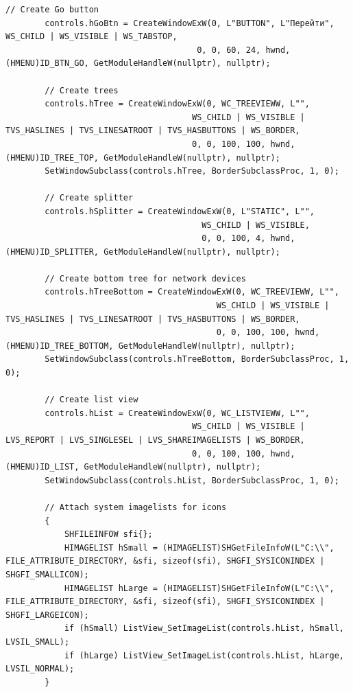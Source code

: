 \begin{lstlisting}[style=CodeListing]
        // Create Go button
        controls.hGoBtn = CreateWindowExW(0, L"BUTTON", L"Перейти", WS_CHILD | WS_VISIBLE | WS_TABSTOP,
                                       0, 0, 60, 24, hwnd, (HMENU)ID_BTN_GO, GetModuleHandleW(nullptr), nullptr);
        
        // Create trees
        controls.hTree = CreateWindowExW(0, WC_TREEVIEWW, L"",
                                      WS_CHILD | WS_VISIBLE | TVS_HASLINES | TVS_LINESATROOT | TVS_HASBUTTONS | WS_BORDER,
                                      0, 0, 100, 100, hwnd, (HMENU)ID_TREE_TOP, GetModuleHandleW(nullptr), nullptr);
        SetWindowSubclass(controls.hTree, BorderSubclassProc, 1, 0);
        
        // Create splitter
        controls.hSplitter = CreateWindowExW(0, L"STATIC", L"",
                                        WS_CHILD | WS_VISIBLE,
                                        0, 0, 100, 4, hwnd, (HMENU)ID_SPLITTER, GetModuleHandleW(nullptr), nullptr);
        
        // Create bottom tree for network devices
        controls.hTreeBottom = CreateWindowExW(0, WC_TREEVIEWW, L"",
                                           WS_CHILD | WS_VISIBLE | TVS_HASLINES | TVS_LINESATROOT | TVS_HASBUTTONS | WS_BORDER,
                                           0, 0, 100, 100, hwnd, (HMENU)ID_TREE_BOTTOM, GetModuleHandleW(nullptr), nullptr);
        SetWindowSubclass(controls.hTreeBottom, BorderSubclassProc, 1, 0);
        
        // Create list view
        controls.hList = CreateWindowExW(0, WC_LISTVIEWW, L"",
                                      WS_CHILD | WS_VISIBLE | LVS_REPORT | LVS_SINGLESEL | LVS_SHAREIMAGELISTS | WS_BORDER,
                                      0, 0, 100, 100, hwnd, (HMENU)ID_LIST, GetModuleHandleW(nullptr), nullptr);
        SetWindowSubclass(controls.hList, BorderSubclassProc, 1, 0);
        
        // Attach system imagelists for icons
        {
            SHFILEINFOW sfi{};
            HIMAGELIST hSmall = (HIMAGELIST)SHGetFileInfoW(L"C:\\", FILE_ATTRIBUTE_DIRECTORY, &sfi, sizeof(sfi), SHGFI_SYSICONINDEX | SHGFI_SMALLICON);
            HIMAGELIST hLarge = (HIMAGELIST)SHGetFileInfoW(L"C:\\", FILE_ATTRIBUTE_DIRECTORY, &sfi, sizeof(sfi), SHGFI_SYSICONINDEX | SHGFI_LARGEICON);
            if (hSmall) ListView_SetImageList(controls.hList, hSmall, LVSIL_SMALL);
            if (hLarge) ListView_SetImageList(controls.hList, hLarge, LVSIL_NORMAL);
        }
        

\end{lstlisting}
